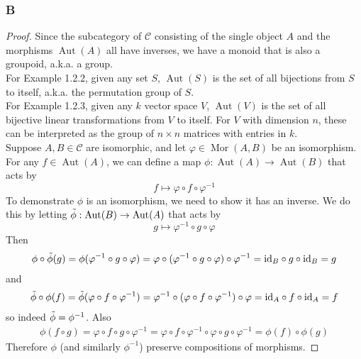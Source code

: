 \documentclass{article}
\newcommand{\id}{\mathrm{id}}
\newcommand{\fC}{\mathscr{C}}
\DeclareMathOperator{\Mor}{Mor}
\DeclareMathOperator{\Aut}{Aut}
\begin{document}
\subsubsection{B}\label{1.2.B}
\begin{proof}
    Since the subcategory of $\fC$ consisting of the single object $A$ and the morphisms $\Aut(A)$ all have inverses, we have a monoid that is also a groupoid, a.k.a. a group.\\
    \newline
    For Example 1.2.2, given any set $S$, $\Aut(S)$ is the set of all bijections from $S$ to itself, a.k.a. the permutation group of $S$.\\
    \newline
    For Example 1.2.3, given any $k$ vector space $V$, $\Aut(V)$ is the set of all bijective linear transformations from $V$ to itself. For $V$ with dimension $n$, these can be interpreted as the group of $n\times n$ matrices with entries in $k$.\\
    \newline
    Suppose $A,B\in \mathscr{C}$ are isomorphic, and let $\varphi\in \Mor(A,B)$ be an isomorphism. For any $f\in \Aut(A)$, we can define a map $\phi:\Aut(A)\to \Aut(B)$ that acts by
    \begin{equation*}
        f\mapsto \varphi \circ f \circ \varphi^{-1}
    \end{equation*}
    To demonstrate $\phi$ is an isomorphism, we need to show it has an inverse. We do this by letting $\Tilde{\phi}:\Aut(B)\to \Aut(A)$ that acts by
    \begin{equation*}
        g\mapsto \varphi^{-1}\circ g\circ \varphi
    \end{equation*}
    Then
    \begin{align*}
        \phi \circ \Tilde{\phi}(g)=\phi(\varphi^{-1}\circ g \circ \varphi)=\varphi \circ (\varphi^{-1}\circ g \circ \varphi)\circ \varphi^{-1}=\id_B \circ g \circ \id_B=g
    \end{align*}
    and 
    \begin{align*}
        \Tilde{\phi}\circ \phi(f)=\Tilde{\phi}(\varphi \circ f \circ \varphi^{-1})=\varphi^{-1}\circ (\varphi \circ f \circ \varphi^{-1}) \circ \varphi=\id_A \circ f \circ \id_A=f
    \end{align*}
    so indeed $\Tilde{\phi}=\phi^{-1}$. Also
    \begin{align*}
        \phi(f\circ g)=\varphi \circ f\circ g \circ \varphi^{-1}=\varphi\circ f \circ \varphi^{-1}\circ \varphi \circ g \circ \varphi^{-1}=\phi(f)\circ \phi(g)
    \end{align*}
    Therefore $\phi$ (and similarly $\phi^{-1}$) preserve compositions of morphisms.
\end{proof}
\end{document}

